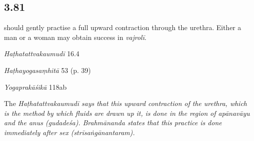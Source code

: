 \begin{ekdosis}
\subsection*{3.81}
\begin{translation} should gently practise a full upward contraction through the urethra. Either a man or a woman may obtain success in \emph{vajrolī}.
\end{translation}


\begin{testimonia}[hp03_081]
\emph{Haṭhatattvakaumudī} 16.4
\begin{versinnote}
\end{versinnote}

\emph{Haṭhayogasaṃhitā} 53 (p. 39)
\begin{versinnote}
\end{versinnote}


\emph{Yogaprakāśikā} 118ab
\begin{versinnote}
\end{versinnote}
\end{testimonia}

\begin{philcomm}[hp03_081]
 The \sl{Haṭhatattvakaumudī} says that this upward contraction of the urethra, which is the method by which fluids are drawn up it, is done in the region of \emph{apānavāyu} and the anus (\emph{gudadeśa}). Brahmānanda states that this practice is done immediately after sex (\emph{strīsaṅgānantaram}).
\end{philcomm}


\end{ekdosis}
